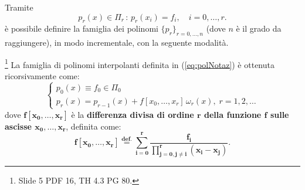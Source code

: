Tramite 
\begin{equation}\label{eq:polNotaz}
    p_r(x)\in\Pi_r\, :\, p_r(x_i)=f_i,\quad i=0,\hdots, r.
\end{equation}
è possibile definire la famiglia dei polinomi $\{p_r\}_{r=0,\hdots,n}$ (dove $n$ è il grado da raggiungere), in modo incrementale, con la seguente modalità.

\begin{theorem}\label{th:formaNewt}\footnote{Slide 5 PDF 16, TH 4.3 PG 80.}
    La famiglia di polinomi interpolanti definita in (\ref{eq:polNotaz}) è ottenuta ricorsivamente come: 
    \begin{equation}\label{eq:famiglia_polinomi_interpolanti}
    \begin{cases}
        p_0(x)\equiv f_0\in\Pi_0\\
        p_r(x) = p_{r-1}(x)+ f[x_0,\hdots, x_r]\,\omega_r(x),\; r=1,2,\hdots
    \end{cases}
    \end{equation}
    dove $\boldsymbol{f[x_0, \hdots, x_r]}$ è la \textbf{differenza divisa di ordine $\boldsymbol r$ della funzione $\boldsymbol f$ sulle ascisse $\boldsymbol{x_0, \hdots, x_r}$}, definita come:
    \begin{equation}\label{eq:differenza_divisa}
       \boldsymbol{f[x_0, \hdots, x_r] \overset{\text{def.}}{=} \sum_{i=0}^r\frac{f_i}{\prod_{j=0, j\neq i}^{r}(x_i-x_j)}}.
    \end{equation}
\end{theorem}
